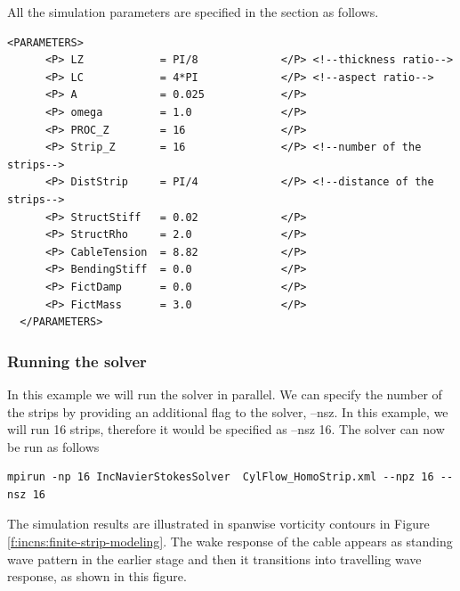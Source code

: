 All the simulation parameters are specified in the section as follows.

    \begin{lstlisting}[style=XMLStyle]
  <PARAMETERS>
      <P> LZ            = PI/8             </P> <!--thickness ratio-->
      <P> LC            = 4*PI             </P> <!--aspect ratio-->
      <P> A             = 0.025            </P>
      <P> omega         = 1.0              </P>
      <P> PROC_Z        = 16               </P>
      <P> Strip_Z       = 16               </P> <!--number of the strips-->
      <P> DistStrip     = PI/4             </P> <!--distance of the strips-->
      <P> StructStiff   = 0.02             </P>  
      <P> StructRho     = 2.0              </P>
      <P> CableTension  = 8.82             </P>
      <P> BendingStiff  = 0.0              </P>
      <P> FictDamp      = 0.0              </P>
      <P> FictMass      = 3.0              </P>
  </PARAMETERS>
     \end{lstlisting}    

\subsubsection{Running the solver}
In this example we will run the solver in parallel. We can specify the number of the strips by providing an additional flag to the solver, –nsz. In this example, we will run 16 strips, therefore it would be specified as –nsz 16. The solver can now be run as follows    

\begin{lstlisting}[style=BashInputStyle]
mpirun -np 16 IncNavierStokesSolver  CylFlow_HomoStrip.xml --npz 16 --nsz 16
\end{lstlisting}

The simulation results are illustrated in spanwise vorticity contours in Figure \ref{f:incns:finite-strip-modeling}. The wake response of the cable appears as standing wave pattern in the earlier stage and then it transitions into travelling wave response, as shown in this figure.  


